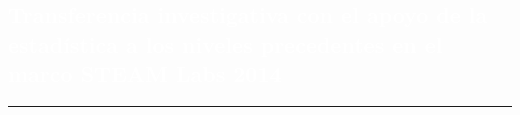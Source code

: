 \begin{titlepage}
\pagecolor{white}
\newcommand{\R}{\ensuremath{\mathbb{R}}}
\BgThispage
{}
\vspace*{-1.1cm}
\noindent
\def\titulo#1{\section{#1}}

\section{\bf\large\textcolor{white}{Transferencia investigativa con el apoyo de la estad\'istica a los niveles precedentes en el marco STEAM Labs 2014}}
\vspace*{2cm}\par
\noindent

\begin{minipage}{0.5\linewidth}
\begin{minipage}{0.45\linewidth}
    \begin{flushright}
        \printauthor
    \end{flushright}
\end{minipage} \hspace{-3pt}
%
\begin{minipage}{0.02\linewidth}
   \color{ptctitle} \rule{1pt}{225pt}
\end{minipage} 
\end{minipage}
\hspace*{-4.5cm}
\begin{minipage}{0.85\linewidth}
\begin{minipage}{0.85\linewidth}
\footnotesize
\vspace{5pt}
    \begin{resumen}
    

\end{resumen}
\end{minipage}
\end{minipage}
\end{titlepage}

